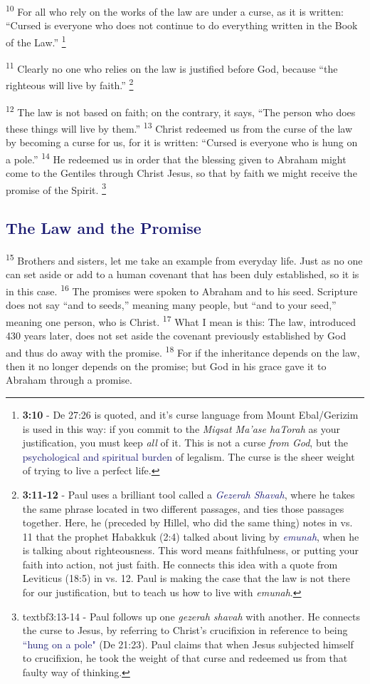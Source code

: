 \documentclass[12pt,twoside]{article}
\newcommand{\vs}[1]{\textsuperscript{#1}}
\newcommand{\vnote}[2]{%
  \begingroup
  \renewcommand\thefootnote{}%
  \footnote{\scriptsize \textbf{}#2}%
  \addtocounter{footnote}{-1}%
  \endgroup
}
\begin{document}
 \vs{10} For all who rely on the works of the law are under a curse, as it is written: ``Cursed is everyone who does not continue to do everything written in the Book of the Law.''\vnote{10}{\textbf{3:10} - De 27:26 is quoted, and it's curse language from Mount Ebal/Gerizim is used in this way: if you commit to the \textit{Miqsat Ma'ase haTorah} as your justification, you must keep \textit{all} of it. This is not a curse \textit{from God}, but the \textcolor{MidnightBlue}{psychological and spiritual burden} of legalism. The curse is the sheer weight of trying to live a perfect life.}
 \vs{11} Clearly no one who relies on the law is justified before God, because ``the righteous will live by faith.''\vnote{11}{\textbf{3:11-12} - Paul uses a brilliant tool called a \textcolor{MidnightBlue}{\textit{Gezerah Shavah}}, where he takes the same phrase located in two different passages, and ties those passages together. Here, he (preceded by Hillel, who did the same thing) notes in vs. 11 that the prophet Habakkuk (2:4) talked about living by \textcolor{MidnightBlue}{\textit{emunah}}, when he is talking about righteousness. This word means faithfulness, or putting your faith into action, not just faith. He connects this idea with a quote from Leviticus (18:5) in vs. 12. Paul is making the case that the law is not there for our justification, but to teach us how to live with \textit{emunah}.}
 \vs{12} The law is not based on faith; on the contrary, it says, ``The person who does these things will live by them.''
 \vs{13} Christ redeemed us from the curse of the law by becoming a curse for us, for it is written: ``Cursed is everyone who is hung on a pole.''
 \vs{14} He redeemed us in order that the blessing given to Abraham might come to the Gentiles through Christ Jesus, so that by faith we might receive the promise of the Spirit.\vnote{14}{textbf{3:13-14} - Paul follows up one \textit{gezerah shavah} with another. He connects the curse to Jesus, by referring to Christ's crucifixion in reference to being \textcolor{MidnightBlue}{``hung on a pole"} (De 21:23). Paul claims that when Jesus subjected himself to crucifixion, he took the weight of that curse and redeemed us from that faulty way of thinking.}

 \subsection*{\textcolor{MidnightBlue}{\textbf{The Law and the Promise}}}

 \hspace{0.5cm} \vs{15} Brothers and sisters, let me take an example from everyday life. Just as no one can set aside or add to a human covenant that has been duly established, so it is in this case.
 \vs{16} The promises were spoken to Abraham and to his seed. Scripture does not say ``and to seeds,'' meaning many people, but ``and to your seed,'' meaning one person, who is Christ.
 \vs{17} What I mean is this: The law, introduced 430 years later, does not set aside the covenant previously established by God and thus do away with the promise.
 \vs{18} For if the inheritance depends on the law, then it no longer depends on the promise; but God in his grace gave it to Abraham through a promise.
\end{document}
